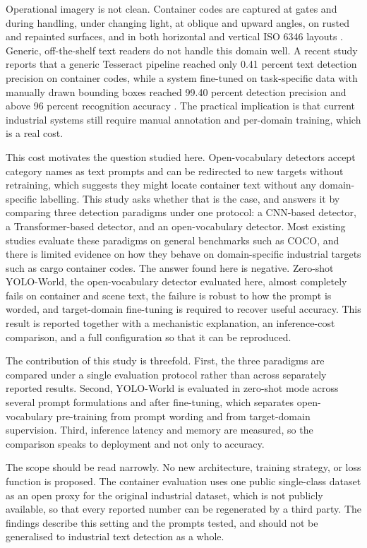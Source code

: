 \documentclass[conference]{IEEEtran}
\begin{document}
Operational imagery is not clean. Container codes are captured at gates and during handling, under changing light, at oblique and upward angles, on rusted and repainted surfaces, and in both horizontal and vertical ISO 6346 layouts \cite{scanbot2024iso6346}. Generic, off-the-shelf text readers do not handle this domain well. A recent study reports that a generic Tesseract pipeline reached only 0.41 percent text detection precision on container codes, while a system fine-tuned on task-specific data with manually drawn bounding boxes reached 99.40 percent detection precision and above 96 percent recognition accuracy \cite{santos2025container}. The practical implication is that current industrial systems still require manual annotation and per-domain training, which is a real cost.

This cost motivates the question studied here. Open-vocabulary detectors accept category names as text prompts and can be redirected to new targets without retraining, which suggests they might locate container text without any domain-specific labelling. This study asks whether that is the case, and answers it by comparing three detection paradigms under one protocol: a CNN-based detector, a Transformer-based detector, and an open-vocabulary detector. Most existing studies evaluate these paradigms on general benchmarks such as COCO, and there is limited evidence on how they behave on domain-specific industrial targets such as cargo container codes. The answer found here is negative. Zero-shot YOLO-World, the open-vocabulary detector evaluated here, almost completely fails on container and scene text, the failure is robust to how the prompt is worded, and target-domain fine-tuning is required to recover useful accuracy. This result is reported together with a mechanistic explanation, an inference-cost comparison, and a full configuration so that it can be reproduced.

The contribution of this study is threefold. First, the three paradigms are compared under a single evaluation protocol rather than across separately reported results. Second, YOLO-World is evaluated in zero-shot mode across several prompt formulations and after fine-tuning, which separates open-vocabulary pre-training from prompt wording and from target-domain supervision. Third, inference latency and memory are measured, so the comparison speaks to deployment and not only to accuracy.

The scope should be read narrowly. No new architecture, training strategy, or loss function is proposed. The container evaluation uses one public single-class dataset as an open proxy for the original industrial dataset, which is not publicly available, so that every reported number can be regenerated by a third party. The findings describe this setting and the prompts tested, and should not be generalised to industrial text detection as a whole.
\end{document}
